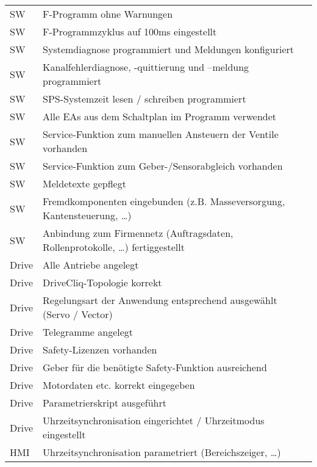 \begin{longtable}{| p{} | p{} | p{} |}
         &  \\
        \hline
        SW & F-Programm ohne Warnungen &  \\
        \hline
        SW & F-Programmzyklus auf 100ms eingestellt &  \\
        \hline
        SW & Systemdiagnose programmiert und Meldungen konfiguriert &  \\
        \hline
        SW & Kanalfehlerdiagnose, -quittierung und –meldung programmiert &  \\
        \hline
        SW & SPS-Systemzeit lesen / schreiben programmiert &  \\
        \hline
        SW & Alle EAs aus dem Schaltplan im Programm verwendet &  \\
        \hline
        SW & Service-Funktion zum manuellen Ansteuern der Ventile vorhanden &  \\
        \hline
        SW & Service-Funktion zum Geber-/Sensorabgleich vorhanden &  \\
        \hline
        SW & Meldetexte gepflegt &  \\
        \hline
        SW & Fremdkomponenten eingebunden (z.B. Masseversorgung, Kantensteuerung, …) &  \\
        \hline
        SW & Anbindung zum Firmennetz (Auftragsdaten, Rollenprotokolle, …) fertiggestellt &  \\
        \hline
        Drive & Alle Antriebe angelegt &  \\
        \hline
        Drive & DriveCliq-Topologie korrekt &  \\
        \hline
        Drive & Regelungsart der Anwendung entsprechend ausgewählt (Servo / Vector) &  \\
        \hline
        Drive & Telegramme angelegt &  \\
        \hline
        Drive & Safety-Lizenzen vorhanden &  \\
        \hline
        Drive & Geber für die benötigte Safety-Funktion ausreichend &  \\
        \hline
        Drive & Motordaten etc. korrekt eingegeben &  \\
        \hline
        Drive & Parametrierskript ausgeführt &  \\
        \hline
        Drive & Uhrzeitsynchronisation eingerichtet / Uhrzeitmodus eingestellt &  \\
        \hline
        HMI & Uhrzeitsynchronisation parametriert (Bereichszeiger, …) &  \\
        \hline

\end{longtable}
